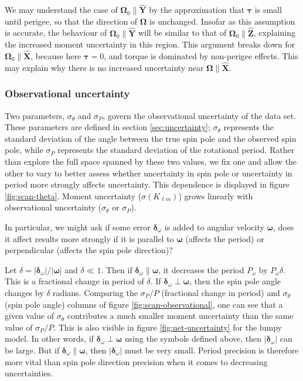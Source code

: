 \documentclass[fleqn,usenatbib]{mnras}
\renewcommand{\unit}[1]{\bm{\hat{#1}}}
\begin{document}
We may understand the case of $\bm \Omega_0 \parallel \unit Y$ by the approximation that $\bm \tau$ is small until perigee, so that the direction of $\bm \Omega$ is unchanged. Insofar as this assumption is accurate, the behaviour of $\bm \Omega_0 \parallel \unit Y$ will be similar to that of $\bm \Omega_0 \parallel \unit Z$, explaining the increased moment uncertainty in this region. This argument breaks down for $\bm \Omega_0 \parallel \unit X$, because here $\bm \tau = 0$, and torque is dominated by non-perigee effects. This may explain why there is no increased uncertainty near $\bm \Omega \parallel \unit X$.


\subsubsection{Observational uncertainty}
\label{sec:scan-uncertainty}
Two parameters, $\sigma_\theta$ and $\sigma_P$, govern the observational uncertainty of the data set. These parameters are defined in section \ref{sec:uncertainty}; $\sigma_\theta$ represents the standard deviation of the angle between the true spin pole and the observed spin pole, while $\sigma_P$ represents the standard deviation of the rotational period. Rather than explore the full space spanned by these two values, we fix one and allow the other to vary to better assess whether uncertainty in spin pole or uncertainty in period more strongly affects uncertainty. This dependence is displayed in figure \ref{fig:scan-theta}. Moment uncertainty ($\sigma(K_{\ell m})$) grows linearly with observational uncertainty ($\sigma_\theta$ or $\sigma_P$).

In particular, we might ask if some error $\bm {\delta}_\omega$ is added to angular velocity $\bm \omega$, does it affect results more strongly if it is parallel to $\bm \omega$ (affects the period) or perpendicular (affects the spin pole direction)?

Let $\delta = |\bm{\delta}_\omega| / |\bm \omega|$ and $\delta \ll 1$. Then if $\bm {\delta}_\omega \parallel \bm \omega$, it decreases the period $P_\omega$ by $P_\omega \delta$. This is a fractional change in period of $\delta$. If $\bm {\delta}_\omega \perp \bm \omega$, then the spin pole angle changes by $\delta$ radians. Comparing the $\sigma_P / P$ (fractional change in period) and $\sigma_\theta$ (spin pole angle) columns of figure \ref{fig:scan-observational}, one can see that a given value of $\sigma_\theta$ contributes a much smaller moment uncertainty than the same value of $\sigma_P/ P$. This is also visible in figure \ref{fig:net-uncertainty} for the lumpy model. In other words, if $\bm {\delta}_\omega \perp \bm \omega$ using the symbols defined above, then $|\bm {\delta}_\omega|$ can be large. But if $\bm{\delta}_\omega  \parallel \bm \omega$, then $|\bm {\delta}_\omega|$ must be very small. Period precision is therefore more vital than spin pole direction precision when it comes to decreasing uncertainties.
\end{document}
